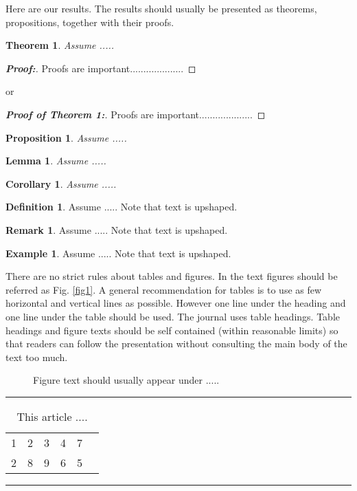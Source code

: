 \documentclass[times,sort&compress,3p]{elsarticle}
\theoremstyle{plain}%
\newtheorem{theorem}{Theorem}
\newtheorem{proposition}{Proposition}
\newtheorem{lemma}{Lemma}
\newtheorem{corollary}{Corollary}
\theoremstyle{definition}
\newtheorem{definition}{Definition}
\newtheorem{remark}{Remark}
\newtheorem{example}{Example}
\begin{document}
Here are our results. The results should usually be presented as theorems, propositions, together with their proofs.

\begin{theorem} Assume .....
\end{theorem}
\begin{proof}[\textbf{\upshape Proof:}] Proofs are important....................
\end{proof}
or
\begin{proof}[\textbf{\upshape Proof of Theorem 1:}] Proofs are important....................
\end{proof}
\begin{proposition} Assume .....
\end{proposition}
\begin{lemma} Assume .....
\end{lemma}
\begin{corollary} Assume .....
\end{corollary}
\begin{definition}Assume ..... Note that text is upshaped.
\end{definition}
\begin{remark} Assume ..... Note that text is upshaped.
\end{remark}
\begin{example} Assume .....  Note that text is upshaped.
\end{example}

There are no strict rules about tables and figures. In the text figures should be referred as Fig. \ref{fig1}. A general recommendation for tables is to use as few horizontal and vertical lines as possible. However one line under the heading and one line under the table should be used. The journal uses table headings. Table headings and figure texts should be self contained (within reasonable limits) so that readers can follow the presentation without consulting the main body of the text too much.

\begin{figure}[]\label{figX} %

\caption{Figure text should usually appear under .....}
\end{figure}
\begin{table}[]\label{tabX}
\caption{This article ....}

\vskip-0.3cm\hrule

\smallskip
\centering\small

\begin{tabular}{cccccc}

1 & 2 & 3 & 4 & 7\\
2 & 8 & 9 & 6 & 5

\end{tabular}
\hrule
\end{table}
\end{document}
